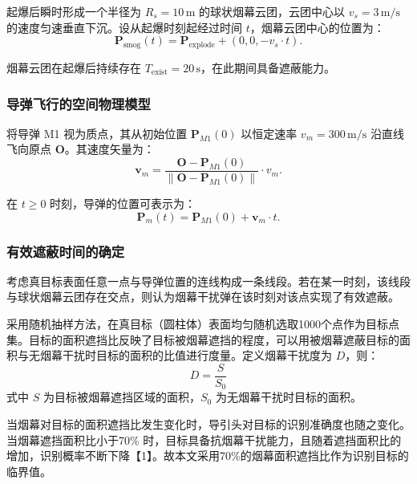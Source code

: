 \documentclass[12pt]{article}
\begin{document}
\begin{CJK}{UTF8}{gbsn}
		起爆后瞬时形成一个半径为 $R_s = 10 \, \mathrm{m}$ 的球状烟幕云团，云团中心以 $v_s = 3 \, \mathrm{m/s}$ 的速度匀速垂直下沉。设从起爆时刻起经过时间 $t$，烟幕云团中心的位置为：
		\begin{equation}
			\mathbf{P}_{\text{smog}}(t) = \mathbf{P}_{\text{explode}} + (0, 0, -v_s \cdot t).
		\end{equation}
		
		烟幕云团在起爆后持续存在 $T_{\text{exist}} = 20 \, \mathrm{s}$，在此期间具备遮蔽能力。
		
		\subsubsection{导弹飞行的空间物理模型}
		
		将导弹 M1 视为质点，其从初始位置 $\mathbf{P}_{M1}(0)$ 以恒定速率 $v_m = 300 \, \mathrm{m/s}$ 沿直线飞向原点 $\mathbf{O}$。其速度矢量为：
		\begin{equation}
			\mathbf{v}_m = \frac{\mathbf{O} - \mathbf{P}_{M1}(0)}{\| \mathbf{O} - \mathbf{P}_{M1}(0) \|} \cdot v_m.
		\end{equation}
		
		在 $t \geq 0$ 时刻，导弹的位置可表示为：
		\begin{equation}
			\mathbf{P}_m(t) = \mathbf{P}_{M1}(0) + \mathbf{v}_m \cdot t.
		\end{equation}
		
		\subsubsection{有效遮蔽时间的确定}
		
		考虑真目标表面任意一点与导弹位置的连线构成一条线段。若在某一时刻，该线段与球状烟幕云团存在交点，则认为烟幕干扰弹在该时刻对该点实现了有效遮蔽。
		
		采用随机抽样方法，在真目标（圆柱体）表面均匀随机选取1000个点作为目标点集。目标的面积遮挡比反映了目标被烟幕遮挡的程度，可以用被烟幕遮蔽目标的面积与无烟幕干扰时目标的面积的比值进行度量。定义烟幕干扰度为 $D$，则：
		\begin{equation}
			D = \frac{S}{S_0}
		\end{equation}
		式中 $S$ 为目标被烟幕遮挡区域的面积，$S_0$ 为无烟幕干扰时目标的面积。
		
		当烟幕对目标的面积遮挡比发生变化时，导引头对目标的识别准确度也随之变化。当烟幕遮挡面积比小于70\% 时，目标具备抗烟幕干扰能力，且随着遮挡面积比的增加，识别概率不断下降【1】。故本文采用70\%的烟幕面积遮挡比作为识别目标的临界值。
		

\end{CJK}
\end{document}
